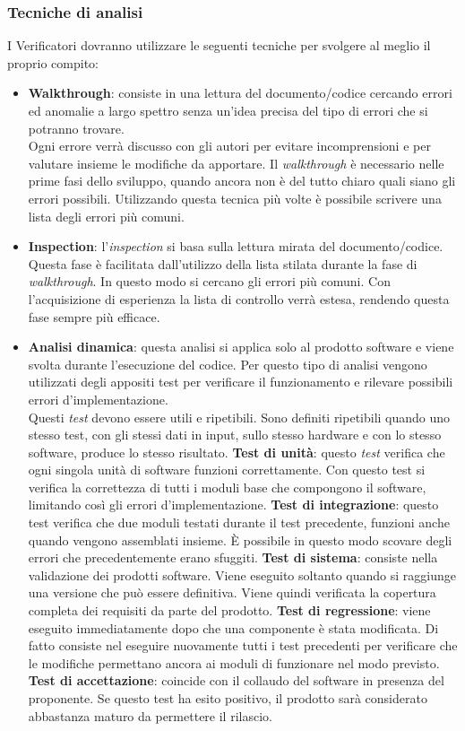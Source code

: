 \documentclass[12pt,a4paper,titlepage]{article}
\begin{document}
\subsubsection{Tecniche di analisi}
I Verificatori dovranno utilizzare le seguenti tecniche per svolgere al meglio il proprio compito:
\begin{itemize}
	\item \textbf{Walkthrough}: consiste in una lettura del documento/codice cercando errori ed
	anomalie a largo spettro senza un'idea precisa del tipo di errori che si potranno trovare.\\ 
	Ogni errore verrà discusso con gli autori per evitare incomprensioni e per valutare insieme
	le modifiche da apportare. Il \textit{walkthrough} è necessario nelle prime fasi dello sviluppo, quando 
	ancora non è del tutto chiaro quali siano gli errori possibili. Utilizzando questa tecnica più
	volte è possibile scrivere una lista degli errori più comuni.
	\item \textbf{Inspection}: l'\textit{inspection} si basa sulla lettura mirata del documento/codice. Questa fase è facilitata dall'utilizzo della lista stilata durante la fase di \textit{walkthrough}. In questo modo 
	si cercano gli errori più comuni. Con l'acquisizione di esperienza la lista di controllo 
	verrà estesa, rendendo questa fase sempre più efficace.
	\item \textbf{Analisi dinamica}: questa analisi si applica solo al prodotto software e viene svolta 
	durante l'esecuzione del codice. Per questo tipo di analisi vengono utilizzati degli appositi test 
	per verificare il funzionamento e rilevare possibili errori d'implementazione.\\
	Questi \textit{test} devono essere utili e ripetibili. Sono definiti 
	ripetibili quando uno stesso test, con gli stessi dati in input, sullo stesso hardware e 
	con lo stesso software, produce lo stesso risultato.
	\subitem \textbf{Test di unità}: questo \textit{test} verifica che ogni singola unità di software funzioni correttamente.
	Con questo test si verifica la correttezza di tutti i moduli base che compongono il 
	software, limitando così gli errori d'implementazione.
	\subitem \textbf{Test di integrazione}: questo test verifica che due moduli testati durante il test precedente,
	funzioni anche quando vengono assemblati insieme. È possibile in questo modo scovare
	degli errori che precedentemente erano sfuggiti. 
	\subitem \textbf{Test di sistema}: consiste nella validazione dei prodotti software. Viene eseguito soltanto 
	quando si raggiunge una versione che può essere definitiva. Viene quindi verificata
	la copertura completa dei requisiti da parte del prodotto.
	\subitem \textbf{Test di regressione}: viene eseguito immediatamente dopo che una componente è stata 
	modificata. Di fatto consiste nel eseguire nuovamente tutti i test precedenti per verificare 
	che le modifiche permettano ancora ai moduli di funzionare nel modo previsto. 
	\subitem \textbf{Test di accettazione}: coincide con il collaudo del software in presenza del proponente. 
	Se questo test ha esito positivo, il prodotto sarà considerato abbastanza maturo da 
	permettere il rilascio.
\end{itemize}
\end{document}
